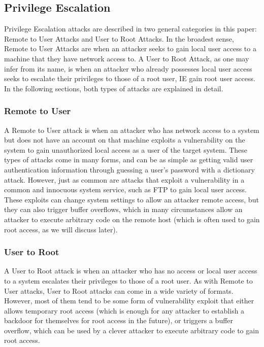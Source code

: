 \documentclass{acm_proc_article-sp}
\begin{document}
    
    \subsection{Privilege Escalation} %
    Privilege Escalation attacks are described in two general categories in this paper: Remote to User Attacks and User to Root Attacks. In the broadest sense, Remote to User Attacks are when an attacker seeks to gain local user access to a machine that they have network access to. A User to Root Attack, as one may infer from its name, is when an attacker who already possesses local user access seeks to escalate their privileges to those of a root user, IE gain root user access. In the following sections, both types of attacks are explained in detail.
    \subsubsection{Remote to User}
    A Remote to User attack is when an attacker who has network access to a system but does not have an account on that machine exploits a vulnerability on the system to gain unauthorized local access as a user of the target system. These types of attacks come in many forms, and can be as simple as getting valid user authentication information through guessing a user's password with a dictionary attack. However, just as common are attacks that exploit a vulnerability in a common and innocuous system service, such as FTP to gain local user access. These exploits can change system settings to allow an attacker remote access, but they can also trigger buffer overflows, which in many circumstances allow an attacker to execute arbitrary code on the remote host (which is often used to gain root access, as we will discuss later). 
    \subsubsection{User to Root}
     A User to Root attack is when an attacker who has no access or local user access to a system escalates their privileges to those of a root user. As with Remote to User attacks, User to Root attacks can come in a wide variety of formats. However, most of them tend to be some form of vulnerability exploit that either allows temporary root access (which is enough for any attacker to establish a backdoor for themselves for root access in the future), or triggers a buffer overflow, which can be used by a clever attacker to execute arbitrary code to gain root access. 
\end{document}
